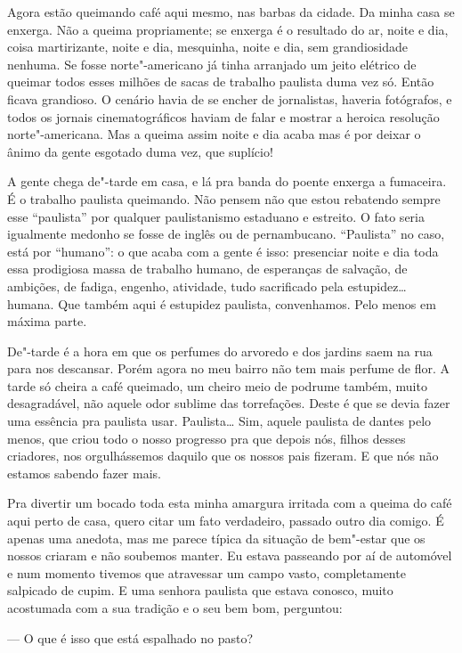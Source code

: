 Agora estão queimando café aqui mesmo, nas barbas da cidade. Da minha
casa se enxerga. Não a queima propriamente; se enxerga é o resultado do
ar, noite e dia, coisa martirizante, noite e dia, mesquinha, noite e
dia, sem grandiosidade nenhuma. Se fosse norte"-americano já tinha
arranjado um jeito elétrico de queimar todos esses milhões de sacas de
trabalho paulista duma vez só. Então ficava grandioso. O cenário havia
de se encher de jornalistas, haveria fotógrafos, e todos os jornais
cinematográficos haviam de falar e mostrar a heroica resolução
norte"-americana. Mas a queima assim noite e dia acaba mas é por deixar o
ânimo da gente esgotado duma vez, que suplício!

A gente chega de"-tarde em casa, e lá pra banda do poente enxerga a
fumaceira. É o trabalho paulista queimando. Não pensem não que estou
rebatendo sempre esse ``paulista'' por qualquer paulistanismo estaduano
e estreito. O fato seria igualmente medonho se fosse de inglês ou de
pernambucano. ``Paulista'' no caso, está por ``humano'': o que acaba com
a gente é isso: presenciar noite e dia toda essa prodigiosa massa de
trabalho humano, de esperanças de salvação, de ambições, de fadiga,
engenho, atividade, tudo sacrificado pela estupidez\ldots{} humana. Que
também aqui é estupidez paulista, convenhamos. Pelo menos em máxima
parte.

De"-tarde é a hora em que os perfumes do arvoredo e dos jardins saem na
rua para nos descansar. Porém agora no meu bairro não tem mais perfume
de flor. A tarde só cheira a café queimado, um cheiro meio de podrume
também, muito desagradável, não aquele odor sublime das torrefações.
Deste é que se devia fazer uma essência pra paulista usar. Paulista\ldots{}
Sim, aquele paulista de dantes pelo menos, que criou todo o nosso
progresso pra que depois nós, filhos desses criadores, nos orgulhássemos
daquilo que os nossos pais fizeram. E que nós não estamos sabendo fazer
mais.

Pra divertir um bocado toda esta minha amargura irritada com a queima do
café aqui perto de casa, quero citar um fato verdadeiro, passado outro
dia comigo. É apenas uma anedota, mas me parece típica da situação de
bem"-estar que os nossos criaram e não soubemos manter. Eu estava
passeando por aí de automóvel e num momento tivemos que atravessar um
campo vasto, completamente salpicado de cupim. E uma senhora paulista
que estava conosco, muito acostumada com a sua tradição e o seu bem bom,
perguntou:

--- O que é isso que está espalhado no pasto?

